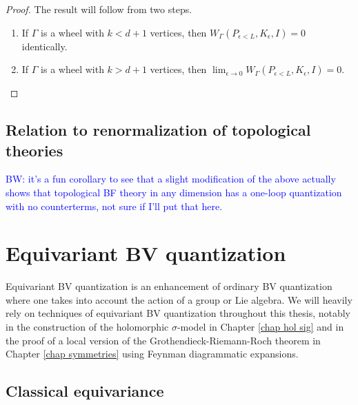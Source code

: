 \documentclass[10pt]{amsart}
\def\brian{\textcolor{blue}{BW: }\textcolor{blue}}
\begin{document}
\begin{proof}
The result will follow from two steps.
\begin{enumerate}
\item If $\Gamma$ is a wheel with $k < d+1$ vertices, then $ W_\Gamma(P_{\epsilon < L}, K_\epsilon,I)
 = 0$ identically. 
\item If $\Gamma$ is a wheel with $k > d+1$ vertices, then $\lim_{\epsilon \to 0} W_\Gamma(P_{\epsilon < L}, K_\epsilon,I) =0$.
\end{enumerate} 
\end{proof}


\subsection{Relation to renormalization of topological theories}

\brian{it's a fun corollary to see that a slight modification of the above actually shows that topological BF theory in any dimension has a one-loop quantization with no counterterms, not sure if I'll put that here.}

\section{Equivariant BV quantization}

Equivariant BV quantization is an enhancement of ordinary BV quantization where one takes into account the action of a group or Lie algebra. 
We will heavily rely on techniques of equivariant BV quantization throughout this thesis, notably in the construction of the holomorphic $\sigma$-model in Chapter \ref{chap hol sig} and in the proof of a local version of the Grothendieck-Riemann-Roch theorem in Chapter \ref{chap symmetries} using Feynman diagrammatic expansions.

\subsection{Classical equivariance}
\end{document}
